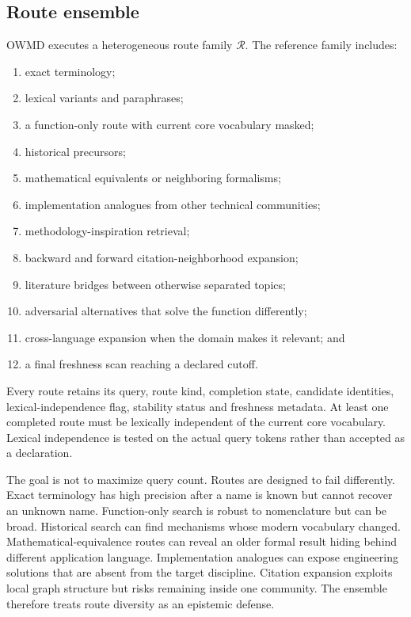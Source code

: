 \documentclass[11pt]{article}
\begin{document}
\subsection{Route ensemble}

OWMD executes a heterogeneous route family \(\mathcal R\). The reference family includes:

\begin{enumerate}[leftmargin=*]
\item exact terminology;
\item lexical variants and paraphrases;
\item a function-only route with current core vocabulary masked;
\item historical precursors;
\item mathematical equivalents or neighboring formalisms;
\item implementation analogues from other technical communities;
\item methodology-inspiration retrieval;
\item backward and forward citation-neighborhood expansion;
\item literature bridges between otherwise separated topics;
\item adversarial alternatives that solve the function differently;
\item cross-language expansion when the domain makes it relevant; and
\item a final freshness scan reaching a declared cutoff.
\end{enumerate}

Every route retains its query, route kind, completion state, candidate identities, lexical-independence flag, stability status and freshness metadata. At least one completed route must be lexically independent of the current core vocabulary. Lexical independence is tested on the actual query tokens rather than accepted as a declaration.

The goal is not to maximize query count. Routes are designed to fail differently. Exact terminology has high precision after a name is known but cannot recover an unknown name. Function-only search is robust to nomenclature but can be broad. Historical search can find mechanisms whose modern vocabulary changed. Mathematical-equivalence routes can reveal an older formal result hiding behind different application language. Implementation analogues can expose engineering solutions that are absent from the target discipline. Citation expansion exploits local graph structure but risks remaining inside one community. The ensemble therefore treats route diversity as an epistemic defense.
\end{document}
